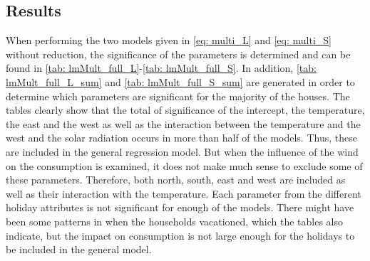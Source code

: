 \subsection{Results}
When performing the two models given in \cref{eq: multi_L} and \cref{eq: multi_S} without reduction, the significance of the parameters is determined and can be found in \cref{tab: lmMult_full_L}-\ref{tab: lmMult_full_S}. In addition, \cref{tab: lmMult_full_L_sum} and \cref{tab: lmMult_full_S_sum} are generated in order to determine which parameters are significant for the majority of the houses. The tables clearly show that the total of significance of the intercept, the temperature, the east and the west as well as the interaction between the temperature and the west and the solar radiation occurs in more than half of the models. Thus, these are included in the general regression model. But when the influence of the wind on the consumption is examined, it does not make much sense to exclude some of these parameters. Therefore, both north, south, east and west are included as well as their interaction with the temperature. Each parameter from the different holiday attributes is not significant for enough of the models. There might have been some patterns in when the households vacationed, which the tables also indicate, but the impact on consumption is not large enough for the holidays to be included in the general model.
\begin{table}
    \centering
\caption{The distribution of significant parameters from the multiple linear regression model for long houses. There are 43 long houses, thus the total of the significance of each parameter for each house is in relation to the number of long houses.}
\label{tab: lmMult_full_L_sum}
\end{table}
